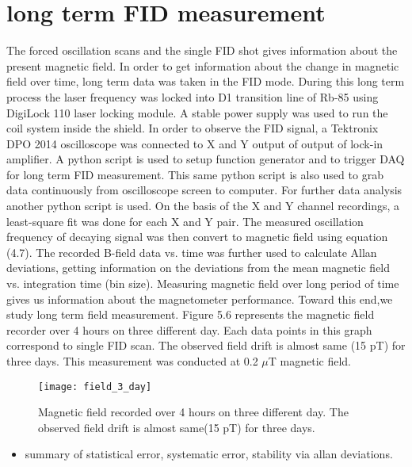 \documentclass[12pt]{report}
\begin{document}
  \section{long term FID measurement}  
The forced oscillation scans and the single FID shot gives information about the present magnetic field. In order to get information about the change in magnetic field over time, long term data was taken in the FID mode. During this long term process the laser frequency was locked into D1 transition line of Rb-85 using DigiLock 110 laser locking module. A stable power supply was used to run the coil system inside the shield. In order to observe the FID signal, a Tektronix DPO 2014 oscilloscope was connected to X and Y output of output of lock-in amplifier. A python script is used to setup function generator and to trigger DAQ for long term FID measurement. This same python script is also used to grab data continuously from oscilloscope screen to computer. For further data analysis  another python script is used. On the basis of the X
and Y channel recordings, a least-square fit was done for each X and Y pair. The measured oscillation frequency of decaying signal was then convert to magnetic field using equation (4.7). The recorded B-field data vs. time was further used to calculate Allan deviations, getting  information on the deviations from the mean magnetic field vs. integration time (bin size). Measuring magnetic field over long period of time gives us information about the magnetometer performance. Toward this end,we study long term field measurement. Figure 5.6 represents the magnetic field recorder over 4 hours on three different day. Each data points in this graph correspond to single FID scan. The observed field drift is almost same (15 pT) for three days. This measurement was conducted at 0.2 $\mu$T magnetic field.
\begin{figure}[h]
\centering\texttt{[image: field\_3\_day]}
\caption{Magnetic field recorded over 4 hours on three different day. The observed field drift is almost same(15 pT) for three days.}
\end{figure}
   \begin{itemize}
   \item summary of statistical error, systematic error, stability via allan deviations.
   \end{itemize}
   \newpage
\end{document}
